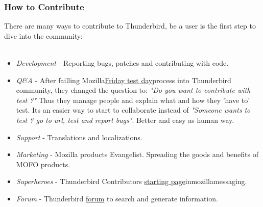 \documentclass[11pt]{scrartcl}
\begin{document}
\subsubsection{How to Contribute}

There are many ways to contribute to Thunderbird, be a user is the first step to dive into the community:
\\
\\
\begin{itemize}
	\item \textit{Development} - Reporting bugs, patches and contributing with code.
	\item \textit{Q\&A} - After failling Mozilla\href{https://quality.mozilla.org/2013/03/mozilla-org-test-day/}{Friday test day}process into Thunderbird community, they changed the question to: \textit{"Do you want to contribute with test ?"} Thus they manage people and explain what and how they 'have to' test. Its an easier way to start to collaborate instead of \textit{"Someone wants to test ? go to url, test and report bugs"}. Better and easy as human way.
	\item \textit{Support} - Translations and localizations.
	\item \textit{Marketing} - Mozilla products Evangelist. Spreading the goods and benefits of MOFO products.
	\item \textit{Superheroes} - Thunderbird Contributors \href{https://support.mozillamessaging.com/es/kb/buscamos-superhroes}{starting page}inmozillamessaging.
	\item \textit{Forum} - Thunderbird \href{https://getsatisfaction.com/mozilla_messaging/}{forum} to search and generate information.
\end{itemize}
\end{document}
